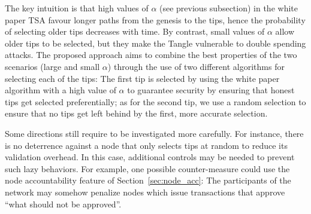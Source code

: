 \documentclass[../main.tex]{subfiles}
\begin{document}
The key intuition is that high values of $\alpha$ (see previous subsection) in the white paper TSA favour longer paths from the genesis to the tips, hence the probability of selecting older tips decreases with time. By contrast, small values of $\alpha$ allow older tips to be selected, but they make the Tangle vulnerable to double spending attacks. The proposed approach aims to combine the best properties of the two scenarios (large and small $\alpha$) through the use of two different algorithms for selecting each of the tips: The first tip is selected by using the white paper algorithm with a high value of $\alpha$ to guarantee security by ensuring that honest tips get selected preferentially; as for the second tip, we use a random selection to ensure that no tips get left behind by the first, more accurate selection.

Some directions still require to be investigated more carefully. For instance, there is no deterrence against a node that only selects tips at random to reduce its validation overhead. In this case, additional controls may be needed to prevent such lazy behaviors. 
For example, one possible counter-measure could use the node accountability feature of Section~\ref{sec:node_acc}:
The participants of the network may somehow penalize nodes which issue transactions that approve \enquote{what should not be approved}.
\end{document}
